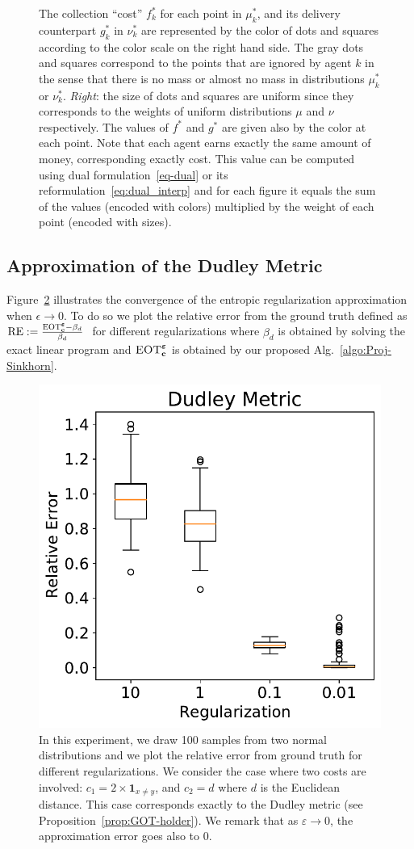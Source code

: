 \begin{figure}[h!]
{The collection ``cost'' $f_k^{*}$ for each point in $\mu_k^{*}$, and its delivery counterpart $g_k^{*}$ in $\nu_k^{*}$ are represented by the color of dots and squares according to the color scale on the right hand side. The gray dots and squares correspond to the points that are ignored by agent $k$ in the sense that there is no mass or almost no mass in distributions $\mu^*_k$ or $\nu^*_k$. \emph{Right}: the size of dots and squares are uniform since they corresponds to the weights of uniform distributions $\mu$ and $\nu$ respectively. The values of $f^*$ and $g^*$ are given also by the color at each point. Note that each agent earns exactly the same amount of money, corresponding exactly \MOT cost. This value can be computed using dual formulation~\eqref{eq-dual} or its reformulation~\eqref{eq:dual_interp} and for each figure it equals the sum of the values (encoded with colors) multiplied by the weight of each point (encoded with sizes).}
\label{fig:potential-dual-ot-viewpoint}
\end{figure}

\newpage

\subsection{Approximation of the Dudley Metric}

Figure~\ref{fig:result_acc} illustrates the convergence of the entropic regularization approximation when $\epsilon\to 0$. To do so  we plot the relative error from the ground truth defined as $\text{RE}:= \frac{ \textsc{EOT}_{\mathbf{c}}^{\bm{\varepsilon}}-\beta_d}{\beta_d}\ $ for different regularizations where $\beta_d$ is obtained by solving the exact linear program and $\textsc{EOT}_{\mathbf{c}}^{\bm{\varepsilon}}$ is obtained by our proposed Alg.~\ref{algo:Proj-Sinkhorn}.

\begin{figure}[h!]
\centering
\includegraphics[width=0.6\linewidth]{figures/box_plot_accuracy.pdf}
\caption{In this experiment, we draw 100 samples from two normal distributions and we plot the relative error from ground truth for different regularizations. We consider the case where two costs are involved: $c_1= 2\times\mathbf{1}_{x\neq y}$, and $c_2=d$ where $d$ is the Euclidean distance. This case corresponds exactly to the Dudley metric (see Proposition~\ref{prop:GOT-holder}). We remark that as $\varepsilon\to 0$, the approximation error goes also to $0$.\label{fig:result_acc}}
\end{figure}
